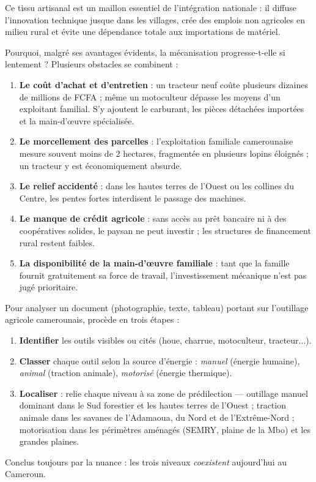 \documentclass[11pt]{article}
\newcounter{popsec}
\newcounter{popsub}
\newcommand{\courssub}[1]{%
  \stepcounter{popsub}%
  \par\vspace{9pt}\noindent{\popxbold\fontsize{11.5}{13}\selectfont\color{popink}{\color{poporange}\thepopsec.\thepopsub}\hspace{6pt}#1}\par\nopagebreak\vspace{4pt}
}
\begin{document}
Ce tissu artisanal est un maillon essentiel de l'intégration nationale : il diffuse l'innovation technique jusque dans les villages, crée des emplois non agricoles en milieu rural et évite une dépendance totale aux importations de matériel.

\courssub{Les limites de la mécanisation au Cameroun}

Pourquoi, malgré ses avantages évidents, la mécanisation progresse-t-elle si lentement ? Plusieurs obstacles se combinent :

\begin{enumerate}
\item \textbf{Le coût d'achat et d'entretien} : un tracteur neuf coûte plusieurs dizaines de millions de FCFA ; même un motoculteur dépasse les moyens d'un exploitant familial. S'y ajoutent le carburant, les pièces détachées importées et la main-d'œuvre spécialisée.
\item \textbf{Le morcellement des parcelles} : l'exploitation familiale camerounaise mesure souvent moins de 2 hectares, fragmentée en plusieurs lopins éloignés ; un tracteur y est économiquement absurde.
\item \textbf{Le relief accidenté} : dans les hautes terres de l'Ouest ou les collines du Centre, les pentes fortes interdisent le passage des machines.
\item \textbf{Le manque de crédit agricole} : sans accès au prêt bancaire ni à des coopératives solides, le paysan ne peut investir ; les structures de financement rural restent faibles.
\item \textbf{La disponibilité de la main-d'œuvre familiale} : tant que la famille fournit gratuitement sa force de travail, l'investissement mécanique n'est pas jugé prioritaire.
\end{enumerate}

\begin{methode}
Pour analyser un document (photographie, texte, tableau) portant sur l'outillage agricole camerounais, procède en trois étapes :
\begin{enumerate}
\item \textbf{Identifier} les outils visibles ou cités (houe, charrue, motoculteur, tracteur...).
\item \textbf{Classer} chaque outil selon la source d'énergie : \emph{manuel} (énergie humaine), \emph{animal} (traction animale), \emph{motorisé} (énergie thermique).
\item \textbf{Localiser} : relie chaque niveau à sa zone de prédilection — outillage manuel dominant dans le Sud forestier et les hautes terres de l'Ouest ; traction animale dans les savanes de l'Adamaoua, du Nord et de l'Extrême-Nord ; motorisation dans les périmètres aménagés (SEMRY, plaine de la Mbo) et les grandes plaines.
\end{enumerate}
Conclus toujours par la nuance : les trois niveaux \emph{coexistent} aujourd'hui au Cameroun.
\end{methode}
\end{document}

